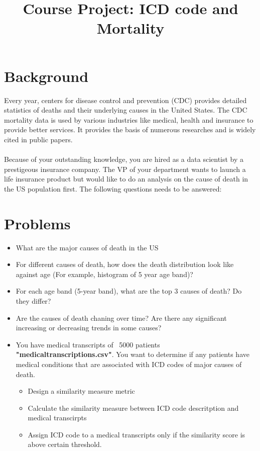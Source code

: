 \documentclass{article}
\title{Course Project: ICD code and Mortality} %
\begin{document}
\maketitle %

\thispagestyle{fancy}
\pagestyle{fancy}

\section{Background}
Every year, centers for disease control and prevention (CDC) provides detailed statistics of deaths and their underlying causes in the United States. The CDC mortality data is used by various industries like medical, health and insurance to provide better services. It provides the basis of numerous researches and is widely cited in public papers.\\\\
Because of your outstanding knowledge, you are hired as a data scientist by a prestigeous insurance company. The VP of your department wants to launch a life insurance product but would like to do an analysis on the cause of death in the US population first. The following questions needs to be answered:

\section{Problems}
\begin{itemize}
\item What are the major causes of death in the US
\item For different causes of death, how does the death distribution look like against age (For example, histogram of 5 year age band)?
\item For each age band (5-year band), what are the top 3 causes of death? Do they differ?
\item Are the causes of death chaning over time? Are there any significant increasing or decreasing trends in some causes?
\item You have medical transcripts of ~5000 patients \textbf{"medicaltranscriptions.csv"}. You want to determine if any patients have medical conditions that are associated with ICD codes of major causes of death.
\begin{itemize}
\item Design a similarity measure metric
\item Calculate the similarity measure between ICD code descritption and medical transcirpts
\item Assign ICD code to a medical transcripts only if the similarity score is above certain threshold.
\end{itemize}
\end{itemize}
\end{document}
